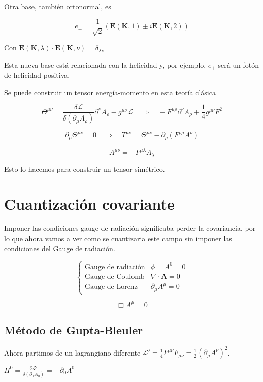Otra base, también ortonormal, es 

$$
e_\pm = \frac{1}{\sqrt{2}} (\mathbf{E}(\mathbf{K}, 1) \pm i \mathbf{E}(\mathbf{K}, 2))
$$

Con $\mathbf{E}(\mathbf{K}, \lambda) \cdot \mathbf{E}(\mathbf{K}, \nu) = \delta_{\lambda\nu}$

Esta nueva base está relacionada con la helicidad y, por ejemplo, $e_+$ será un fotón de helicidad positiva.

Se puede construir un tensor energía-momento en esta teoría clásica

$$
\Theta^{\mu\nu} = \frac{\delta \mathcal{L}}{\delta(\partial_\mu A_\rho)} \partial^\nu A_\rho - g^{\mu\nu} \mathcal{L} \quad \Rightarrow \quad -F^{\mu\rho} \partial^\nu A_\rho + \frac{1}{4} g^{\mu\nu} F^2
$$

$$
\partial_\mu \Theta^{\mu\nu} = 0 \quad \Rightarrow \quad T^{\mu\nu} = \Theta^{\mu\nu} - \partial_\rho (F^{\rho\mu} A^\nu)
$$

$$A^{\mu\nu} = -F^{\mu\lambda} A_\lambda$$

Esto lo hacemos para construir un tensor simétrico.
\section{Cuantización covariante}

Imponer las condiciones gauge de radiación significaba perder la covariancia, por lo que ahora vamos a ver como se cuantizaria este campo sin imponer las condiciones del Gauge de radiación.

$$
\begin{cases}
\text{Gauge de radiación} & \phi = A^0 = 0 \\
\text{Gauge de Coulomb} & \nabla \cdot \mathbf{A} = 0 \\
\text{Gauge de Lorenz} & \partial_\mu A^\mu = 0
\end{cases}
$$

$$
\Box A^\mu = 0
$$


\subsection{Método de Gupta-Bleuler}

Ahora partimos de un lagrangiano diferente $\mathcal{L}' = \frac{1}{4} F^{\mu\nu} F_{\mu\nu} = \frac{1}{2} (\partial_\mu A^\nu)^2$.

$
\Pi^0 = \frac{\delta \mathcal{L}'}{\delta(\partial_0 A_0)} = -\partial_0 A^0 
$

